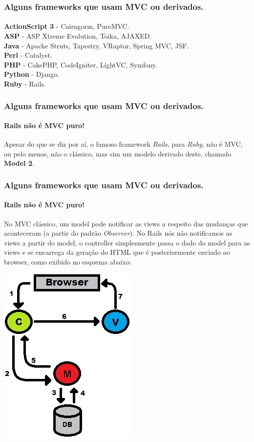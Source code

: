 \documentclass{beamer}
\begin{document}
\begin{frame}
\frametitle{Alguns frameworks que usam MVC ou derivados.}
\framesubtitle{}
	\textbf{ActionScript 3} - Cairngorm, PureMVC.\\
	\textbf{ASP} - ASP Xtreme Evolution, Toika, AJAXED.\\
	\textbf{Java} - Apache Struts, Tapestry, VRaptor, Spring MVC, JSF.\\
	\textbf{Perl} - Catalyst.\\
	\textbf{PHP} - CakePHP, CodeIgniter, LightVC, Symfony.\\
	\textbf{Python} - Django.\\
	\textbf{Ruby} - Rails.
\end{frame}

\begin{frame}
\frametitle{Alguns frameworks que usam MVC ou derivados.}
\framesubtitle{Rails não é MVC puro!}
	Apesar do que se diz por aí, o famoso framework \textit{Rails}, para \textit{Ruby}, não é MVC, ou pelo menos, não o clássico, 
	mas sim um modelo derivado deste, chamado \textbf{Model 2}.
\end{frame}

\begin{frame}
\frametitle{Alguns frameworks que usam MVC ou derivados.}
\framesubtitle{Rails não é MVC puro!}
	No MVC clássico, um model pode notificar as views a respeito das mudanças que aconteceram (a partir do padrão \textit{Observer}). No Rails
	nós não notificamos as views a partir do model, o controller simplesmente passa o dado do model para as views e se encarrega da geração do HTML que 
	é posteriormente enviado ao browser, como exibido no esquema abaixo:
	\begin{center}
		\includegraphics[scale=0.35]{RailsMVC.jpg}
	\end{center} 
\end{frame}
\end{document}
